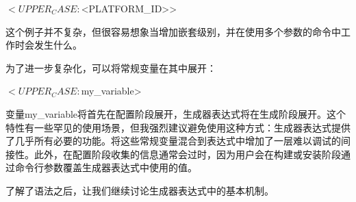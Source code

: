 \begin{shell}
$<UPPER_CASE:$<PLATFORM_ID>>
\end{shell}

这个例子并不复杂，但很容易想象当增加嵌套级别，并在使用多个参数的命令中工作时会发生什么。

为了进一步复杂化，可以将常规变量在其中展开：

\begin{shell}
$<UPPER_CASE:${my_variable}>
\end{shell}

变量my\_variable将首先在配置阶段展开，生成器表达式将在生成阶段展开。这个特性有一些罕见的使用场景，但我强烈建议避免使用这种方式：生成器表达式提供了几乎所有必要的功能。将这些常规变量混合到表达式中增加了一层难以调试的间接性。此外，在配置阶段收集的信息通常会过时，因为用户会在构建或安装阶段通过命令行参数覆盖生成器表达式中使用的值。

了解了语法之后，让我们继续讨论生成器表达式中的基本机制。













